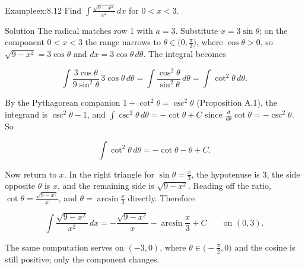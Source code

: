 \documentclass[a4paper,12pt,oneside]{memoir}
\begin{document}
\begin{workedexample}
\begin{envexample}{Example}{ex:8.12}{}
Find \(\displaystyle\int \frac{\sqrt{9 - x^{2}}}{x^{2}}\,dx\) for \(0 < x < 3\).
\end{envexample}
\begin{envsolution}{Solution}{}{}
The radical matches row 1 with \(a = 3\). Substitute \(x = 3\sin\theta\); on the component \(0 < x < 3\) the range narrows to \(\theta \in \bigl(0, \tfrac{\pi}{2}\bigr)\), where \(\cos\theta > 0\), so \(\sqrt{9 - x^{2}} = 3\cos\theta\) and \(dx = 3\cos\theta\,d\theta\). The integral becomes

\[ \int \frac{3\cos\theta}{9\sin^{2}\theta}\,3\cos\theta\,d\theta = \int \frac{\cos^{2}\theta}{\sin^{2}\theta}\,d\theta = \int \cot^{2}\theta\,d\theta. \]

By the Pythagorean companion \(1 + \cot^{2}\theta = \csc^{2}\theta\) (Proposition A.1), the integrand is \(\csc^{2}\theta - 1\), and \(\int\csc^{2}\theta\,d\theta = -\cot\theta + C\) since \(\tfrac{d}{d\theta}\cot\theta = -\csc^{2}\theta\). So

\[ \int \cot^{2}\theta\,d\theta = -\cot\theta - \theta + C. \]

Now return to \(x\). In the right triangle for \(\sin\theta = \tfrac{x}{3}\), the hypotenuse is \(3\), the side opposite \(\theta\) is \(x\), and the remaining side is \(\sqrt{9 - x^{2}}\). Reading off the ratio, \(\cot\theta = \tfrac{\sqrt{9 - x^{2}}}{x}\), and \(\theta = \arcsin\tfrac{x}{3}\) directly. Therefore

\[ \int \frac{\sqrt{9 - x^{2}}}{x^{2}}\,dx = -\frac{\sqrt{9 - x^{2}}}{x} - \arcsin\frac{x}{3} + C \qquad\text{on } (0, 3). \]

The same computation serves on \((-3, 0)\), where \(\theta \in \bigl(-\tfrac{\pi}{2}, 0\bigr)\) and the cosine is still positive; only the component changes. \qedmark
\end{envsolution}
\end{workedexample}
\end{document}
